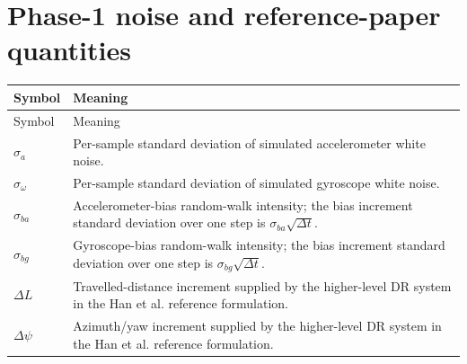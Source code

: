 \section*{Phase-1 noise and reference-paper quantities}
\begin{longtable}{p{}p{}}
\toprule
Symbol & Meaning\\
\midrule
\endfirsthead
\toprule
Symbol & Meaning\\
\midrule
\endhead
$\sigma_a$ & Per-sample standard deviation of simulated accelerometer white noise.\\
$\sigma_{\omega}$ & Per-sample standard deviation of simulated gyroscope white noise.\\
$\sigma_{ba}$ & Accelerometer-bias random-walk intensity; the bias increment standard deviation over one step is $\sigma_{ba}\sqrt{\Delta t}$.\\
$\sigma_{bg}$ & Gyroscope-bias random-walk intensity; the bias increment standard deviation over one step is $\sigma_{bg}\sqrt{\Delta t}$.\\
$\Delta L$ & Travelled-distance increment supplied by the higher-level DR system in the Han et al. reference formulation.\\
$\Delta\psi$ & Azimuth/yaw increment supplied by the higher-level DR system in the Han et al. reference formulation.\\
\bottomrule
\end{longtable}
